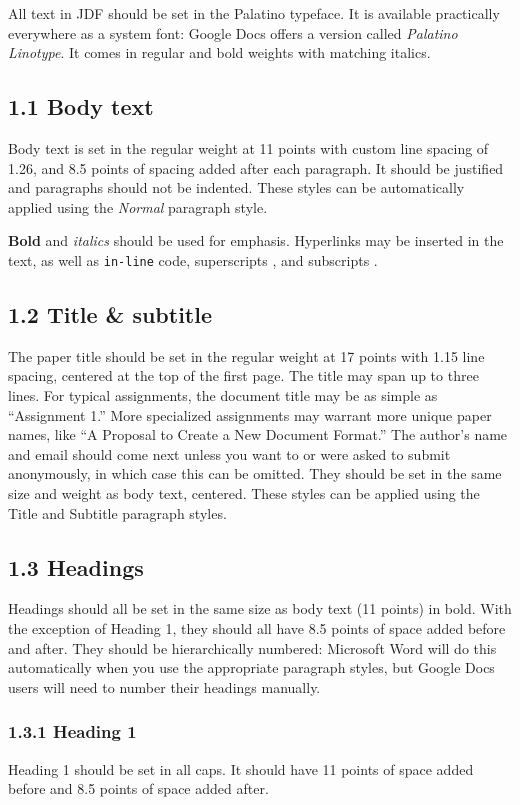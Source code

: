 {{{{All text in JDF should be set in the Palatino typeface. It is available practically everywhere as a system font: Google Docs offers a version called \emph{Palatino Linotype}. It comes in regular and bold weights with matching italics.

\subsection*{1.1 Body text}
Body text is set in the regular weight at 11 points with custom line spacing of 1.26, and 8.5 points of spacing added after each paragraph. It should be justified and paragraphs should not be indented. These styles can be automatically applied using the \emph{Normal} paragraph style.

\textbf{Bold} and \emph{italics} should be used for emphasis. Hyperlinks may be inserted in the text, as well as \texttt{in-line} code, superscripts , and subscripts .

\subsection*{1.2 Title \& subtitle}
The paper title should be set in the regular weight at 17 points with 1.15 line spacing, centered at the top of the first page. The title may span up to three lines. For typical assignments, the document title may be as simple as “Assignment 1.” More specialized assignments may warrant more unique paper names, like “A Proposal to Create a New Document Format.”
The author’s name and email should come next unless you want to or were asked to submit anonymously, in which case this can be omitted. They should be set in the same size and weight as body text, centered. These styles can be applied using the Title and Subtitle paragraph styles.

\subsection*{1.3 Headings}
Headings should all be set in the same size as body text (11 points) in bold. With the exception of Heading 1, they should all have 8.5 points of space added before and after. They should be hierarchically numbered: Microsoft Word will do this automatically when you use the appropriate paragraph styles, but Google Docs users will need to number their headings manually.

\subsubsection*{1.3.1 Heading 1}
Heading 1 should be set in all caps. It should have 11 points of space added before and 8.5 points of space added after.

}}}}
